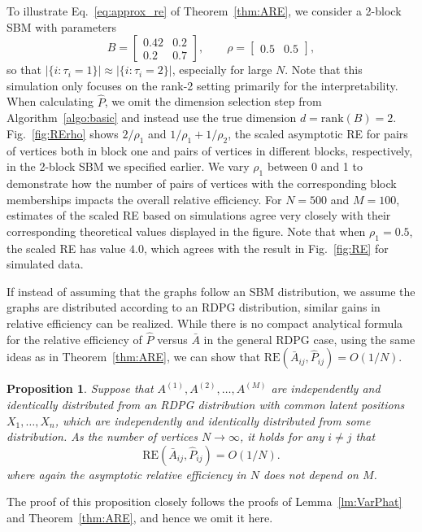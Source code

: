 \documentclass[10pt,letterpaper]{article}
\newtheorem{proposition}[fact]{Proposition}
\renewcommand{\hat}{\widehat}
\begin{document}
To illustrate Eq.~\ref{eq:approx_re} of Theorem~\ref{thm:ARE}, we consider a 2-block SBM with parameters
\begin{equation}
B = \begin{bmatrix}
0.42 & 0.2 \\
0.2 & 0.7
\end{bmatrix}
,\qquad \rho = \begin{bmatrix}
0.5 & 0.5
\end{bmatrix},
\label{eq:sim_setting}
\end{equation}
so that $|\{i:\tau_i=1\}| \approx |\{i:\tau_i=2\}|$, especially for large $N$.
Note that this simulation only focuses on the rank-2 setting primarily for the interpretability.
When calculating $\hat{P}$, we omit the dimension selection step from Algorithm~\ref{algo:basic} and instead use the true dimension $d = \mathrm{rank}(B) = 2$.
Fig.~\ref{fig:RErho} shows $2/\rho_1$ and $1/\rho_1+1/\rho_2$, the scaled asymptotic RE for pairs of vertices both in block one and pairs of vertices in different blocks, respectively, in the 2-block SBM we specified earlier.
We vary $\rho_1$ between 0 and 1 to demonstrate how the number of pairs of vertices with the corresponding block memberships impacts the overall relative efficiency.
For $N=500$ and $M=100$, estimates of the scaled RE based on simulations agree very closely with their corresponding theoretical values displayed in the figure. Note that when $\rho_1 = 0.5$, the scaled RE has value $4.0$, which agrees with the result in Fig.~\ref{fig:RE} for simulated data.



If instead of assuming that the graphs follow an SBM distribution, we assume the graphs are distributed according to an RDPG distribution, similar gains in relative efficiency can be realized.
While there is no compact analytical formula for the relative efficiency of $\hat{P}$ versus $\bar{A}$ in the general RDPG case, using the same ideas as in Theorem~\ref{thm:ARE}, we can show that $\mathrm{RE}(\bar{A}_{ij},\hat{P}_{ij}) = O(1/N)$.

\begin{proposition}
Suppose that $A^{(1)},A^{(2)},\dotsc,A^{(M)}$ are independently and identically distributed from an RDPG distribution with common latent positions $X_1,\dotsc,X_n$, which are independently and identically distributed from some distribution.
As the number of vertices $N\to\infty$, it holds for any $i\neq j$ that 
\[
    \mathrm{RE}(\bar{A}_{ij},\hat{P}_{ij}) = O(1/N).
\]
where again the asymptotic relative efficiency in $N$ does not depend on $M$.
\end{proposition}
The proof of this proposition closely follows the proofs of Lemma~\ref{lm:VarPhat} and Theorem~\ref{thm:ARE}, and hence we omit it here.
\end{document}
